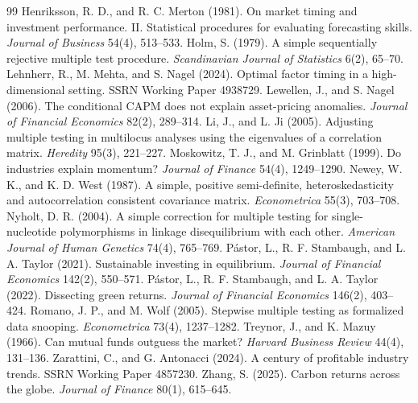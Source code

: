 \begin{thebibliography}{99}
 Henriksson, R. D., and R. C. Merton (1981). On market timing and investment performance. II. Statistical procedures for evaluating forecasting skills. \textit{Journal of Business} 54(4), 513--533.
 Holm, S. (1979). A simple sequentially rejective multiple test procedure. \textit{Scandinavian Journal of Statistics} 6(2), 65--70.
 Lehnherr, R., M. Mehta, and S. Nagel (2024). Optimal factor timing in a high-dimensional setting. SSRN Working Paper 4938729.
 Lewellen, J., and S. Nagel (2006). The conditional CAPM does not explain asset-pricing anomalies. \textit{Journal of Financial Economics} 82(2), 289--314.
 Li, J., and L. Ji (2005). Adjusting multiple testing in multilocus analyses using the eigenvalues of a correlation matrix. \textit{Heredity} 95(3), 221--227.
 Moskowitz, T. J., and M. Grinblatt (1999). Do industries explain momentum? \textit{Journal of Finance} 54(4), 1249--1290.
 Newey, W. K., and K. D. West (1987). A simple, positive semi-definite, heteroskedasticity and autocorrelation consistent covariance matrix. \textit{Econometrica} 55(3), 703--708.
 Nyholt, D. R. (2004). A simple correction for multiple testing for single-nucleotide polymorphisms in linkage disequilibrium with each other. \textit{American Journal of Human Genetics} 74(4), 765--769.
 P\'astor, L., R. F. Stambaugh, and L. A. Taylor (2021). Sustainable investing in equilibrium. \textit{Journal of Financial Economics} 142(2), 550--571.
 P\'astor, L., R. F. Stambaugh, and L. A. Taylor (2022). Dissecting green returns. \textit{Journal of Financial Economics} 146(2), 403--424.
 Romano, J. P., and M. Wolf (2005). Stepwise multiple testing as formalized data snooping. \textit{Econometrica} 73(4), 1237--1282.
 Treynor, J., and K. Mazuy (1966). Can mutual funds outguess the market? \textit{Harvard Business Review} 44(4), 131--136.
 Zarattini, C., and G. Antonacci (2024). A century of profitable industry trends. SSRN Working Paper 4857230.
 Zhang, S. (2025). Carbon returns across the globe. \textit{Journal of Finance} 80(1), 615--645.
\end{thebibliography}


